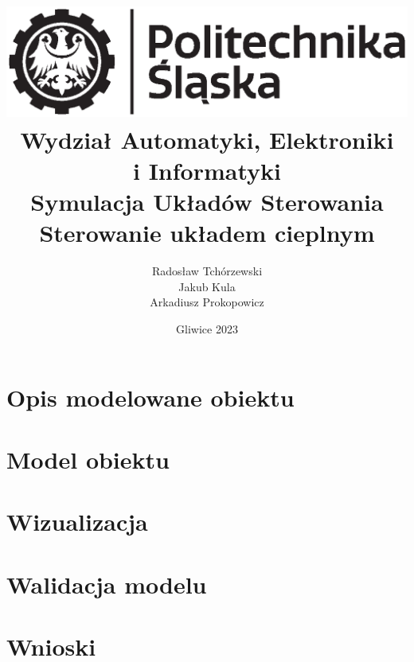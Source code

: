 \documentclass[12pt,titlepage]{article}
\title{
\includegraphics[scale=0.75]{img/politechnika_sl_logo_bw_poziom_pl.eps}\\
\textbf{Wydział Automatyki, Elektroniki\\
i Informatyki}\\
\vspace*{1cm}
Symulacja Układów Sterowania \\Sterowanie układem cieplnym}
\author{Radosław Tchórzewski\\
Jakub Kula\\
Arkadiusz Prokopowicz}
\date{Gliwice 2023}
\begin{document}
\maketitle

\tableofcontents

\vspace{1cm}

\listoffigures

\vspace{1cm}

\listoftables

\newpage

\section{Opis modelowane obiektu}
\section{Model obiektu}
\section{Wizualizacja}
\section{Walidacja modelu}
\section{Wnioski}
\end{document}

